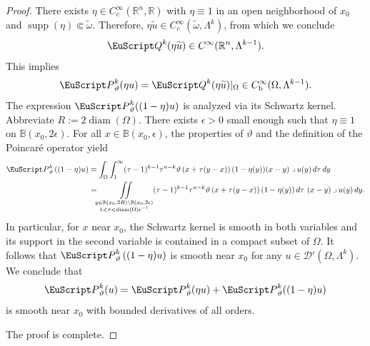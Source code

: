 \documentclass[10pt,a4paper]{amsart}
\theoremstyle{definition}
\theoremstyle{remark}
\numberwithin{equation}{section}
\newcommand{\bbB}{{\mathbb B}}
\newcommand{\bbR}{{\mathbb R}}
\newcommand{\calD}{{\mathcal D}}
\newcommand{\euP}{{\EuScript P}}
\newcommand{\euQ}{{\EuScript Q}}
\renewcommand{\restriction}{|}
\newcommand{\Ball}[2]{\bbB(#1,#2)}
\newcommand{\diameter}[1]{\operatorname{diam}(#1)}
\newcommand{\supp}{\operatorname{supp}}
\newcommand{\contract}{\mathbin{\lrcorner}}
\newcommand{\Domain}{{\Omega}}
\newcommand{\subdomain}{{\omega}}
\newcommand{\Alt}[1]{\Lambda^{#1}}
\newcommand{\Poincare}{\euP}
\newcommand{\weight}{\vartheta}
\newcommand{\bounded}{\mathrm{b}}
\begin{document}
\begin{proof}
    There exists $\eta \in C^{\infty}_{c}(\bbR^{n},\bbR)$ with $\eta \equiv 1$ in an open neighborhood of $x_{0}$ and $\supp(\eta) \Subset \widetilde\subdomain$.
    Therefore, $\eta \widetilde{u} \in C^{\infty}_{c}(\widetilde\subdomain,\Alt{k})$, from which we conclude 
    \begin{align*}
        \euQ^{k}( \eta \widetilde{u} ) \in C^{\infty}(\bbR^{n},\Alt{k-1}).
    \end{align*}
    This implies 
    \begin{align*}
        \Poincare^{k}_{\weight}( \eta u ) = \euQ^{k}( \eta \widetilde{u} ) \restriction_{\Domain} \in C^{\infty}_{\bounded}(\Domain,\Alt{k-1})
        .
    \end{align*}
    The expression $\Poincare^{k}_{\weight}( (1-\eta) u )$ is analyzed via its Schwartz kernel. 
Abbreviate $R := 2\diameter{\Domain}$. 
    There exists $\epsilon > 0$ small enough such that $\eta \equiv 1$ on $\Ball{x_0}{2\epsilon}$.
    For all $x \in \Ball{x_0}{\epsilon}$, 
    the properties of $\weight$ and the definition of the Poincar\'e operator yield 
    \begin{align*}
        \Poincare^{k}_{\weight}\left( (1-\eta) u \right)
        &
        =
        \int_{\Domain}
        \int_{1}^{\infty} 
        (\tau-1)^{k-1} \tau^{n-k} \weight\left( x + \tau( y - x ) \right) 
        ( 1 - \eta(y) ) ( x - y ) \contract u(y) 
        \,d\tau
        \,dy
\\&
        =
        \iint\limits_{\substack{ y \in \Ball{x_0}{2R} \setminus \Ball{x_0}{2\epsilon} \\ 1 < \tau < \diameter{\Domain} \epsilon^{-1} }}
        (\tau-1)^{k-1} \tau^{n-k} \weight\left( x + \tau( y - x ) \right) 
        ( 1 - \eta(y) )
        \,d\tau
        \ ( x - y ) \contract u(y) 
        \,dy
        .
    \end{align*}
    In particular, for $x$ near $x_{0}$, the Schwartz kernel is smooth in both variables and its support in the second variable is contained in a compact subset of $\Domain$.
    It follows that $\Poincare^{k}_{\weight}\left( (1-\eta) u \right)$ is smooth near $x_{0}$ for any $u \in \calD'(\Domain,\Alt{k})$.
We conclude that 
    \begin{align*}
        \Poincare^{k}_{\weight}( u ) = \Poincare^{k}_{\weight}( \eta u ) + \Poincare^{k}_{\weight}( (1-\eta) u )
    \end{align*}
    is smooth near $x_{0}$ with bounded derivatives of all orders. 
    
    The proof is complete.
\end{proof}
    
\end{document}
